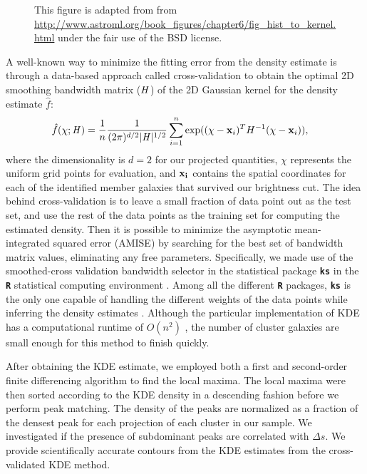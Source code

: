 \begin{figure*}
	\caption{This figure is adapted from \citealt{Vanderplas2012} from
\href{http://www.astroml.org/book\_figures/chapter6/fig\_hist\_to\_kernel.html}{http://www.astroml.org/book\_figures/chapter6/fig\_hist\_to\_kernel.html}
under the fair use of the BSD license. \label{fig:bias_variance_tradeoff}
}
\end{figure*}
A well-known way to minimize the fitting error from the density estimate is through
a data-based approach called cross-validation to obtain 
the optimal 2D smoothing
bandwidth matrix ($\mathbf{\it H}$) of the 2D Gaussian kernel for the
density estimate $\hat{f}$:
\begin{align}
	\hat{f}(\chi; \mathbf{\it H}) &= \frac{1}{n} \frac{1}{(2\pi)^{d/2}|\mathbf{\it H}|^{1/2}}
	\sum_{i=1}^n \exp((\chi-{\bf x}_i)^T H^{-1} (\chi-{\bf x}_i)),
	\label{eq:cross_validated_bandwidth}
\end{align}
where the dimensionality is $d=2$ for our projected quantities,
$\chi$ represents the uniform grid points for evaluation, and 
$\bf{x}_i$ contains the spatial coordinates for each of the identified member 
galaxies that survived our brightness cut.
The idea behind cross-validation is to leave a small fraction of data point 
out as the test set, and use the rest of the data points as 
the training set for computing the estimated density.
Then it is possible to minimize the asymptotic mean-integrated squared error
(AMISE)  by searching
for the best set of bandwidth matrix values, eliminating any free parameters. 
Specifically, we made use of the smoothed-cross validation \citep{Hall1992} 
bandwidth selector in the statistical package {\bf \texttt{ks}} \citep{Duong2007} 
in the {\bf \texttt{R}} statistical computing environment \citep{R_core}. 
Among all the different {\bf \texttt{R}} packages, {\bf \texttt{ks}} is the
only one capable of handling the different weights of the data points 
while inferring the density estimates \citep{Deng2011}. 
Although the particular implementation of KDE has a computational runtime of $O(n^2)$ 
, the number of cluster galaxies are
small enough for this method to finish quickly. 

After obtaining the KDE estimate, we employed both a first and second-order  
finite differencing algorithm to find the local maxima.  
The local maxima were then sorted according to the KDE density in a descending
fashion before we perform peak matching. The density
of the peaks are normalized as a fraction of the densest peak for each
projection of each cluster in our sample. 
We investigated if the presence of subdominant peaks are correlated with
$\Delta s$. We provide scientifically accurate contours from the KDE 
estimates from the cross-validated KDE method. 


